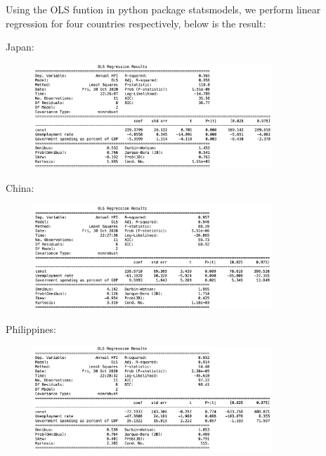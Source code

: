 \documentclass[11pt]{article}
\begin{document}
Using the OLS funtion in python package statsmodels, we perform linear regression for four countries respectively, below is the result:

Japan:
\begin{figure}[H]
\begin{center}
    \includegraphics[width=0.8\textwidth]{./image/Reg_JPN.png}
\end{center}
\end{figure}

China:
\begin{figure}[H]
\begin{center}
    \includegraphics[width=0.8\textwidth]{./image/Reg_CHN.png}
\end{center}
\end{figure}

Philippines:
\begin{figure}[H]
\begin{center}
    \includegraphics[width=0.8\textwidth]{./image/Reg_PHL.png}
\end{center}
\end{figure}
\end{document}
